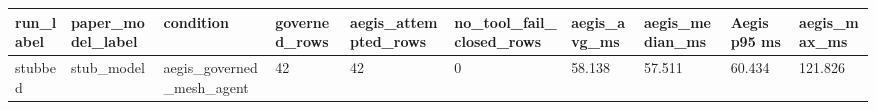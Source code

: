 \begin{tabular}{llllllllll}
 \hline
run\_label & paper\_model\_label & condition & governed\_rows & aegis\_attempted\_rows & no\_tool\_fail\_closed\_rows & aegis\_avg\_ms & aegis\_median\_ms & Aegis p95 ms & aegis\_max\_ms \\
 \hline
stubbed & stub\_model & aegis\_governed\_mesh\_agent & 42 & 42 & 0 & 58.138 & 57.511 & 60.434 & 121.826 \\
 \hline
\end{tabular}
